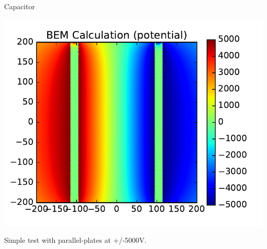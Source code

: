 \documentclass[xcolor=dvipsnames]{beamer}
\begin{document}
\begin{frame}{Capacitor}
  \begin{center}
    \includegraphics[height=0.8\textheight]{capacitor-drift-full.pdf}

    Simple test with parallel-plates at +/-5000V.

  \end{center}
\end{frame}
\end{document}
